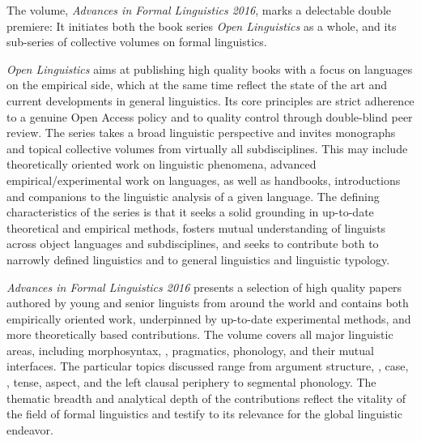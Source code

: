 \begin{refsection}

The  volume, \textit{Advances in Formal  Linguistics 2016}, marks a delectable double premiere: It initiates both the book series \textit{Open  Linguistics} as a whole, and its sub-series of collective volumes on formal  linguistics. 

\textit{Open  Linguistics} aims at publishing high quality books with a focus on  languages on the empirical side, which at the same time reflect the state of the art and current developments in general linguistics. Its core principles are strict adherence to a genuine Open Access policy and to quality control through double-blind peer review. The series takes a broad linguistic perspective and invites monographs and topical collective volumes from virtually all subdisciplines. This may include theoretically oriented work on  linguistic phenomena, advanced empirical\slash experimental work on  languages, as well as handbooks, introductions and companions to the linguistic analysis of a given language. The defining characteristics of the series is that it seeks a solid grounding in up-to-date theoretical and empirical methods, fosters mutual understanding of linguists across object languages and subdisciplines, and seeks to contribute both to narrowly defined  linguistics and to general linguistics and linguistic typology. 

\textit{Advances in Formal  Linguistics 2016} presents a selection of high quality papers authored by young and senior linguists from around the world and contains both empirically oriented work, underpinned by up-to-date experimental methods, and more theoretically based contributions. The volume covers all major linguistic areas, including morphosyntax, , pragmatics, phonology, and their mutual interfaces. The particular topics discussed range from argument structure, , case, , tense, aspect, and the left clausal periphery to segmental phonology. The thematic breadth and analytical depth of the contributions reflect the vitality of the field of formal  linguistics and testify to its relevance for the global linguistic endeavor. 


\end{refsection}
